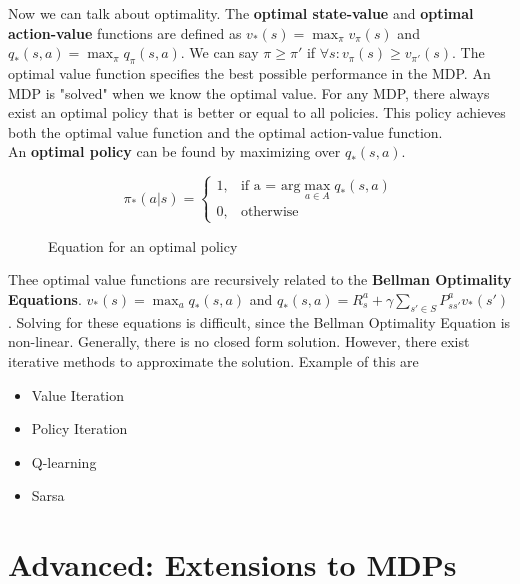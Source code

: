 Now we can talk about optimality. The \textbf{optimal state-value} and \textbf{optimal action-value} functions are defined as $v_*(s) = \max_\pi v_\pi(s)$ and $q_*(s, a) = \max_\pi q_\pi(s, a)$. We can say $\pi \geq \pi'$ if $\forall s: v_\pi(s) \geq v_{\pi'}(s)$. The optimal value function specifies the best possible performance in the MDP. An MDP is "solved" when we know the optimal value. For any MDP, there always exist an optimal policy that is better or equal to all policies. This policy achieves both the optimal value function and the optimal action-value function.\\

An \textbf{optimal policy} can be found by maximizing over $q_*(s, a)$.

\begin{figure}[h]
	\begin{equation}
		\pi_*(a | s) =
		\begin{cases}
			1, & \text{if a = arg$\max_{a \in A} q_*(s, a)$}\\
			0, & \text{otherwise}
		\end{cases}
	\end{equation}
	\caption{Equation for an optimal policy}
	\label{form:optimal-policy}
\end{figure}

Thee optimal value functions are recursively related to the \textbf{Bellman Optimality Equations}. $v_*(s) = \max_a q_*(s, a)$ and $q_*(s, a) = R^a_s + \gamma \sum_{s' \in S} P^a_{ss'}v_*(s')$. Solving for these equations is difficult, since the Bellman Optimality Equation is non-linear. Generally, there is no closed form solution. However, there exist iterative methods to approximate the solution. Example of this are
\begin{itemize}
	\item Value Iteration
	\item Policy Iteration
	\item Q-learning
	\item Sarsa
\end{itemize}

\section{Advanced: Extensions to MDPs}


